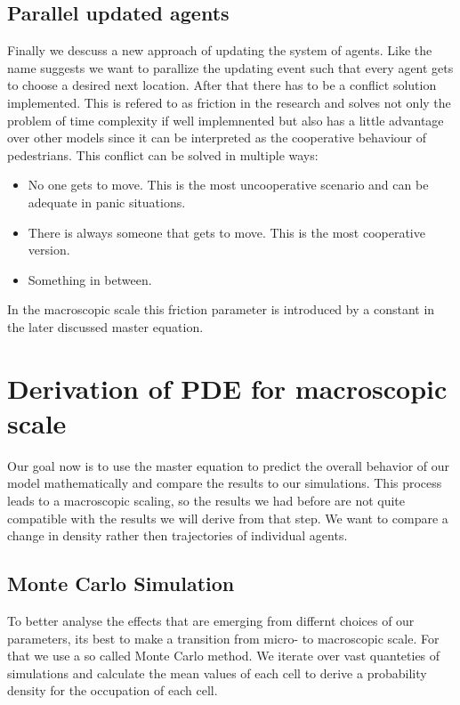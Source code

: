 \subsection{Parallel updated agents}
Finally we descuss a new approach of updating the system of agents. Like the name suggests we want to parallize the 
updating event such that every agent gets to choose a desired next location. After that there has to be a conflict solution implemented.
This is refered to as friction in the research and solves not only the problem of time complexity if well implemnented but 
also has a little advantage over other models since it can be interpreted as the cooperative behaviour of pedestrians. 
This conflict can be solved in multiple ways: 
\begin{itemize}
   \item No one gets to move. This is the most uncooperative scenario and can be adequate in panic situations.
   \item There is always someone that gets to move. This is the most cooperative version.
   \item Something in between. 
\end{itemize} 
In the macroscopic scale this friction parameter is introduced by a constant in the later discussed master equation.

\newpage
\section{Derivation of PDE for macroscopic scale}
Our goal now is to use the master equation to predict the overall behavior of our model mathematically and compare the results to our simulations. 
This process leads to a macroscopic scaling, so the results we had before are not quite compatible with the results we will derive from that step.
We want to compare a change in density rather then trajectories of individual agents. 

\subsection{Monte Carlo Simulation}
To better analyse the effects that are emerging from differnt choices of our parameters, 
its best to make a transition from micro- to macroscopic scale.
For that we use a so called Monte Carlo method. We iterate over vast quanteties of simulations and calculate the mean values of each cell 
to derive a probability density for the occupation of each cell. 

